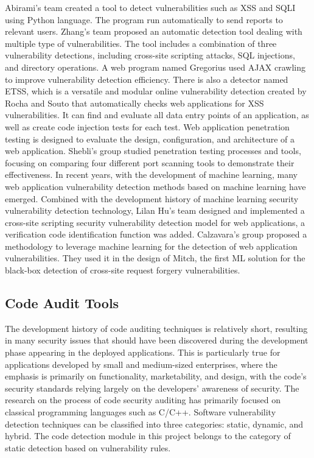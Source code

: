 \documentclass[journal]{IEEEtran}
\begin{document}
Abirami's team created a tool to detect vulnerabilities such as XSS and SQLI using Python language. The program run automatically to send reports to relevant users\cite{9155908}. Zhang's team proposed an automatic detection tool dealing with multiple type of vulnerabilities. The tool includes a combination of three vulnerability detections, including cross-site scripting attacks, SQL injections, and directory operations\cite{8983828}. A web program named Gregorius used AJAX crawling to improve vulnerability detection efficiency\cite{9092613}. There is also a detector named ETSS, which is a versatile and modular online vulnerability detection created by Rocha and Souto that automatically checks web applications for XSS vulnerabilities. It can find and evaluate all data entry points of an application, as well as create code injection tests for each test\cite{6924244}. Web application penetration testing is designed to evaluate the design, configuration, and architecture of a web application. Shebli's group  studied penetration testing processes and tools, focusing on comparing four different port scanning tools to demonstrate their effectiveness\cite{8378035}. In recent years, with the development of machine learning, many web application vulnerability detection methods based on machine learning have emerged. Combined with the development history of machine learning security vulnerability detection technology, Lilan Hu's team designed and implemented a cross-site scripting security vulnerability detection model for web applications, a verification code identification function was added\cite{article10.1088/1742-6596/1827/1/012061}. Calzavara's group proposed a methodology to leverage machine learning for the detection of web application vulnerabilities. They used it in the design of Mitch, the first ML solution for the black-box detection of cross-site request forgery vulnerabilities\cite{8966601}.

\subsection*{Code Audit Tools}

The development history of code auditing techniques is relatively short, resulting in many security issues that should have been discovered during the development phase appearing in the deployed applications. This is particularly true for applications developed by small and medium-sized enterprises, where the emphasis is primarily on functionality, marketability, and design, with the code's security standards relying largely on the developers' awareness of security. The research on the process of code security auditing has primarily focused on classical programming languages such as C/C++. Software vulnerability detection techniques can be classified into three categories: static, dynamic, and hybrid. The code detection module in this project belongs to the category of static detection based on vulnerability rules.
\end{document}
